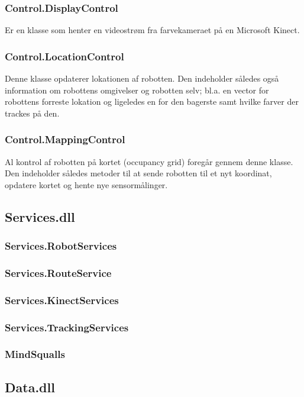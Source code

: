 \subsubsection{Control.DisplayControl}
Er en klasse som henter en videostrøm fra farvekameraet på en Microsoft Kinect.

\subsubsection{Control.LocationControl}
Denne klasse opdaterer lokationen af robotten.
Den indeholder således også information om robottens omgivelser og robotten selv; bl.a. en vector for robottens forreste lokation og ligeledes en for den bagerste samt hvilke farver der trackes på den.

\subsubsection{Control.MappingControl}
Al kontrol af robotten på kortet (occupancy grid) foregår gennem denne klasse.
Den indeholder således metoder til at sende robotten til et nyt koordinat, opdatere kortet og hente nye sensormålinger.

\subsection{Services.dll}\label{arkitektur:services}


\subsubsection{Services.RobotServices}

\subsubsection{Services.RouteService}

\subsubsection{Services.KinectServices}

\subsubsection{Services.TrackingServices}

\subsubsection{MindSqualls}

\subsection{Data.dll}\label{arkitektur:data}







